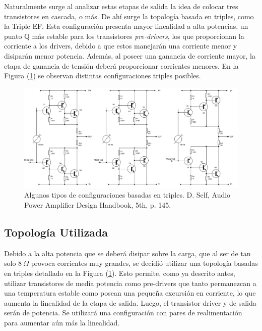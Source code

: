 Naturalmente surge al analizar estas etapas de salida la idea de colocar tres transistores en cascada, o más. De ahí surge la topología basada en triples, como la Triple EF. Esta configuración presenta mayor linealidad a alta potencias, un punto Q más estable para los transistores \textit{pre-drivers}, los que proporcionan la corriente a los drivers, debido a que estos manejarán una corriente menor y disiparán menor potencia. Además, al poseer una ganancia de corriente mayor, la etapa de ganancia de tensión deberá proporcionar corrientes menores. En la Figura (\ref{fig:triples}) se observan distintas configuraciones triples posibles.

\begin{figure}[H]
\centering
	\includegraphics[width=\textwidth]{ImagenesOutput-Stage/pag145-triples.png}
	\caption{Algunos tipos de configuraciones basadas en triples. D. Self, Audio Power Amplifier Design Handbook, 5th, p. 145.}
	\label{fig:triples}
\end{figure}

\subsection{Topología Utilizada}
Debido a la alta potencia que se deberá disipar sobre la carga, que al ser de tan solo $8 \ \Omega$ provoca corrientes muy grandes, se decidió utilizar una topología basadas en triples detallado en la Figura (\ref{fig:triples}). Esto permite, como ya descrito antes, utilizar transistores de media potencia como pre-drivers que tanto permanezcan a una temperatura estable como posean una pequeña excursión en corriente, lo que aumenta la linealidad de la etapa de salida. Luego, el transistor driver y de salida serán de potencia. Se utilizará una configuración con pares de realimentación para aumentar aún más la linealidad.

